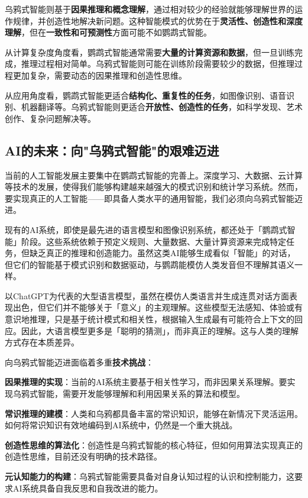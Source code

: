 乌鸦式智能则基于{\bf 因果推理和概念理解}，通过相对较少的经验就能够理解世界的运作规律，并创造性地解决新问题。这种智能模式的优势在于{\bf 灵活性、创造性和深度理解}，但在{\bf 一致性和可预测性}方面可能不如鹦鹉式智能。

从计算复杂度角度看，鹦鹉式智能通常需要{\bf 大量的计算资源和数据}，但一旦训练完成，推理过程相对简单。乌鸦式智能则可能在训练阶段需要较少的数据，但推理过程更加复杂，需要动态的因果推理和创造性思维。

从应用角度看，鹦鹉式智能更适合{\bf 结构化、重复性的任务}，如图像识别、语音识别、机器翻译等。乌鸦式智能则更适合{\bf 开放性、创造性的任务}，如科学发现、艺术创作、复杂问题解决等。

\subsection{AI的未来：向"乌鸦式智能"的艰难迈进}

当前的人工智能发展主要集中在鹦鹉式智能的完善上。深度学习、大数据、云计算等技术的发展，使得我们能够构建越来越强大的模式识别和统计学习系统。然而，要实现真正的人工智能——即具备人类水平的通用智能，我们必须向乌鸦式智能迈进。

现有的AI系统，即使是最先进的语言模型和图像识别系统，都还处于「鹦鹉式智能」阶段。这些系统依赖于预定义规则、大量数据、大量计算资源来完成特定任务，但缺乏真正的推理和创造能力。虽然这类AI能够生成看似「智能」的对话，但它们的智能基于模式识别和数据驱动，与鹦鹉能模仿人类发音但不理解其语义一样。

以ChatGPT为代表的大型语言模型，虽然在模仿人类语言并生成连贯对话方面表现出色，但它们并不能够关于「意义」的主观理解。这些模型无法感知、体验或有意识地推理，只是基于统计模式和相关性，根据输入生成最有可能符合上下文的回应。因此，大语言模型更多是「聪明的猜测」，而非真正的理解。这与人类的理解方式存在本质差异。

向乌鸦式智能迈进面临着多重{\bf 技术挑战}：

{\bf 因果推理的实现}：当前的AI系统主要基于相关性学习，而非因果关系理解。要实现乌鸦式智能，需要开发能够理解和利用因果关系的算法和模型。

{\bf 常识推理的建模}：人类和乌鸦都具备丰富的常识知识，能够在新情况下灵活运用。如何将常识知识有效地编码到AI系统中，仍然是一个重大挑战。

{\bf 创造性思维的算法化}：创造性是乌鸦式智能的核心特征，但如何用算法实现真正的创造性思维，目前还没有明确的技术路径。

{\bf 元认知能力的构建}：乌鸦式智能需要具备对自身认知过程的认识和控制能力，这要求AI系统具备自我反思和自我改进的能力。

